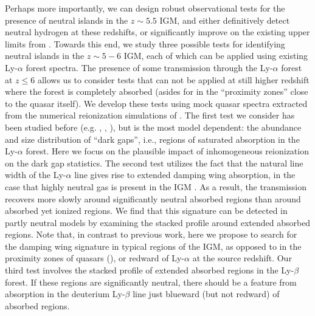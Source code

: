 Perhaps more importantly, we can design robust observational tests for the presence of neutral islands in the $z \sim 5.5$ IGM, and either
definitively detect neutral hydrogen at these redshifts, or significantly improve on the existing upper limits from \citet{McGreer:2011dm}. 
Towards this end, we study three possible tests for identifying neutral islands in the $z \sim 5-6$ IGM, each of which 
can be applied using existing 
Ly-$\alpha$ forest spectra. The presence of some transmission through the Ly-$\alpha$ forest at $z \leq 6$ allows us to consider
tests that can not be applied at still higher redshift where the forest is 
completely absorbed (asides for in the ``proximity zones'' close to the quasar itself). 
We develop these tests using mock quasar spectra extracted from the numerical reionization simulations of
\citet{McQuinn:2007dy}.
The first test we consider has been studied before (e.g. \citealt{Fan:2005es}, \citealt{2010MNRAS.407.1328M}, \citealt{McGreer:2011dm}), but is the most model 
dependent: the abundance and size distribution of ``dark gaps'', i.e., regions of saturated absorption in the Ly-$\alpha$ forest. Here we focus on
the plausible impact of inhomogeneous reionization on the dark gap statistics. The second test utilizes the fact that the natural line width of the Ly-$\alpha$ line gives rise to extended damping wing absorption, in
the case that highly neutral gas is present in the IGM \citep{MiraldaEscude:1997qb}. As a result, the transmission recovers more
slowly around significantly neutral absorbed regions than around absorbed yet ionized regions. We find that this
signature can be detected in partly neutral models by examining the stacked profile around extended absorbed regions. Note that, in contrast to previous work, here we propose to search
for the damping wing signature in typical regions of the IGM, as opposed to in the proximity zones of quasars (\citealt{Mesinger:2006kn,2013MNRAS.428.3058S}), or redward of Ly-$\alpha$ at the source redshift. 
Our third test involves the stacked profile
of extended absorbed regions in the Ly-$\beta$ forest. If these regions are significantly neutral, there should be a feature
from absorption in the deuterium Ly-$\beta$ line just blueward (but not redward) of absorbed regions.

